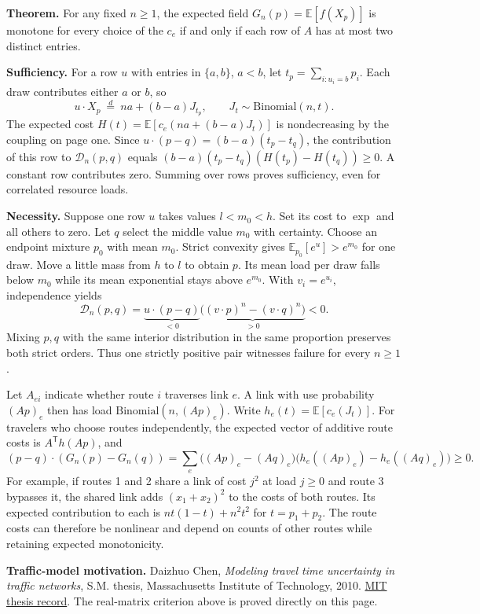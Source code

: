 \documentclass[11pt,letterpaper]{article}
\newcommand{\E}{\mathbb E}
\newcommand{\head}[1]{\par\vspace{5pt}{\large\bfseries\color{ink}#1}\par\vspace{1pt}}
\newcommand{\subhead}[1]{{\bfseries\color{ink}#1}\quad}
\newcommand{\gapF}{\mathcal D_n}
\begin{document}
\subhead{Theorem.} For any fixed $n\ge1$, the expected field $G_n(p)=\E[f(X_p)]$ is monotone for every choice of the $c_e$ if and only if each row of $A$ has at most two distinct entries.

\subhead{Sufficiency.} For a row $u$ with entries in $\{a,b\}$, $a<b$, let $t_p=\sum_{i:u_i=b}p_i$. Each draw contributes either $a$ or $b$, so
\[
 u\cdot X_p\ \overset{d}{=}\ na+(b-a)J_{t_p},\qquad J_t\sim\mathrm{Binomial}(n,t).
\]
The expected cost $H(t)=\E[c_e(na+(b-a)J_t)]$ is nondecreasing by the coupling on page one. Since $u\cdot(p-q)=(b-a)(t_p-t_q)$, the contribution of this row to $\gapF(p,q)$ equals $(b-a)(t_p-t_q)(H(t_p)-H(t_q))\ge0$. A constant row contributes zero. Summing over rows proves sufficiency, even for correlated resource loads.

\subhead{Necessity.} Suppose one row $u$ takes values $l<m_0<h$. Set its cost to $\exp$ and all others to zero. Let $q$ select the middle value $m_0$ with certainty. Choose an endpoint mixture $p_0$ with mean $m_0$. Strict convexity gives $\E_{p_0}[e^u]>e^{m_0}$ for one draw. Move a little mass from $h$ to $l$ to obtain $p$. Its mean load per draw falls below $m_0$ while its mean exponential stays above $e^{m_0}$. With $v_i=e^{u_i}$, independence yields
\[
 \gapF(p,q)=\underbrace{u\cdot(p-q)}_{<0}
      \underbrace{\big((v\cdot p)^n-(v\cdot q)^n\big)}_{>0}<0.
\]
Mixing $p,q$ with the same interior distribution in the same proportion preserves both strict orders. Thus one strictly positive pair witnesses failure for every $n\ge1$.

\head{Expected route costs on a network}
Let $A_{ei}$ indicate whether route $i$ traverses link $e$. A link with use probability $(Ap)_e$ then has load $\mathrm{Binomial}(n,(Ap)_e)$. Write $h_e(t)=\E[c_e(J_t)]$. For travelers who choose routes independently, the expected vector of additive route costs is $A^{\mathsf T}h(Ap)$, and
\[
 (p-q)\cdot(G_n(p)-G_n(q))=
 \sum_e\big((Ap)_e-(Aq)_e\big)\big(h_e((Ap)_e)-h_e((Aq)_e)\big)\ge0 .
\]
For example, if routes 1 and 2 share a link of cost $j^2$ at load $j\ge0$ and route 3 bypasses it, the shared link adds $(x_1+x_2)^2$ to the costs of both routes. Its expected contribution to each is $nt(1-t)+n^2t^2$ for $t=p_1+p_2$. The route costs can therefore be nonlinear and depend on counts of other routes while retaining expected monotonicity.

{\small\textbf{Traffic-model motivation.} Daizhuo Chen, \emph{Modeling travel time uncertainty in traffic networks}, S.M. thesis, Massachusetts Institute of Technology, 2010.
\href{https://dspace.mit.edu/handle/1721.1/61889}{MIT thesis record}. The real-matrix criterion above is proved directly on this page.}
\end{document}
